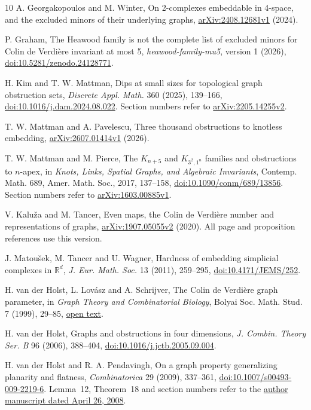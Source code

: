 \documentclass[11pt]{article}
\newcommand{\R}{\mathbb R}
\begin{document}
\begin{thebibliography}{10}
A. Georgakopoulos and M. Winter,
On 2-complexes embeddable in 4-space, and the excluded minors of their
underlying graphs,
\href{https://arxiv.org/abs/2408.12681v1}{arXiv:2408.12681v1} (2024).

P. Graham,
The Heawood family is not the complete list of excluded minors for
Colin de Verdi\`ere invariant at most 5,
\emph{heawood-family-mu5}, version 1 (2026),
\href{https://doi.org/10.5281/zenodo.24128771}
{doi:10.5281/zenodo.24128771}.

H. Kim and T. W. Mattman,
Dips at small sizes for topological graph obstruction sets,
\emph{Discrete Appl. Math.} 360 (2025), 139--166,
\href{https://doi.org/10.1016/j.dam.2024.08.022}
{doi:10.1016/j.dam.2024.08.022}.
Section numbers refer to
\href{https://arxiv.org/abs/2205.14255v2}{arXiv:2205.14255v2}.

T. W. Mattman and A. Pavelescu,
Three thousand obstructions to knotless embedding,
\href{https://arxiv.org/abs/2607.01414v1}{arXiv:2607.01414v1} (2026).

T. W. Mattman and M. Pierce,
The $K_{n+5}$ and $K_{3^2,1^n}$ families and obstructions to $n$-apex,
in \emph{Knots, Links, Spatial Graphs, and Algebraic Invariants},
Contemp. Math. 689, Amer. Math. Soc., 2017, 137--158,
\href{https://doi.org/10.1090/conm/689/13856}
{doi:10.1090/conm/689/13856}.
Section numbers refer to
\href{https://arxiv.org/abs/1603.00885v1}{arXiv:1603.00885v1}.

V. Kalu\v{z}a and M. Tancer,
Even maps, the Colin de Verdi\`ere number and representations of graphs,
\href{https://arxiv.org/abs/1907.05055v2}{arXiv:1907.05055v2} (2020).
All page and proposition references use this version.

J. Matou\v{s}ek, M. Tancer and U. Wagner,
Hardness of embedding simplicial complexes in $\R^d$,
\emph{J. Eur. Math. Soc.} 13 (2011), 259--295,
\href{https://doi.org/10.4171/JEMS/252}{doi:10.4171/JEMS/252}.

H. van der Holst, L. Lov\'asz and A. Schrijver,
The Colin de Verdi\`ere graph parameter,
in \emph{Graph Theory and Combinatorial Biology},
Bolyai Soc. Math. Stud. 7 (1999), 29--85,
\href{https://ir.cwi.nl/pub/1257/1257D.pdf}{open text}.

H. van der Holst,
Graphs and obstructions in four dimensions,
\emph{J. Combin. Theory Ser. B} 96 (2006), 388--404,
\href{https://doi.org/10.1016/j.jctb.2005.09.004}
{doi:10.1016/j.jctb.2005.09.004}.

H. van der Holst and R. A. Pendavingh,
On a graph property generalizing planarity and flatness,
\emph{Combinatorica} 29 (2009), 337--361,
\href{https://doi.org/10.1007/s00493-009-2219-6}
{doi:10.1007/s00493-009-2219-6}.
Lemma~12, Theorem~18 and section numbers refer to the
\href{https://www.researchgate.net/publication/220441340_On_a_graph_property_generalizing_planarity_and_flatness}
{author manuscript dated April 26, 2008}.
\end{thebibliography}
\end{document}
